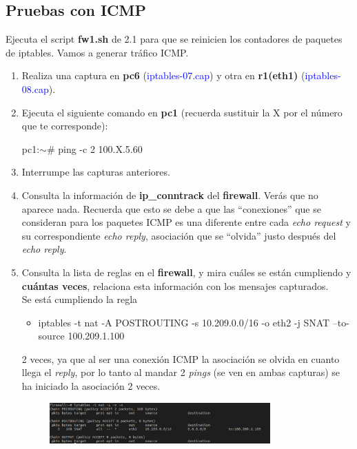 \documentclass[12pt, a4paper]{report}
\begin{document}
\subsection{Pruebas con ICMP}
Ejecuta el script \textbf{fw1.sh} de 2.1 para que se reinicien los contadores de paquetes de iptables. Vamos
a generar tráfico ICMP.
\begin{enumerate}
	\item Realiza una captura en \textbf{pc6} (\textcolor{blue}{iptables-07.cap}) y otra en \textbf{r1(eth1)} (\textcolor{blue}{iptables-08.cap}).
	\item Ejecuta el siguiente comando en \textbf{pc1} (recuerda sustituir la X por el número que te corresponde):
	\begin{center}
		pc1:$\sim$\# ping -c 2 100.X.5.60
	\end{center}
	\item Interrumpe las capturas anteriores.
	\item Consulta la información de \textbf{ip\_conntrack }del \textbf{firewall}. Verás que no aparece nada. Recuerda
	que esto se debe a que las “conexiones” que se consideran para los paquetes ICMP es una diferente
	entre cada \textit{echo request }y su correspondiente \textit{echo reply}, asociación que se “olvida” justo después
	del \textit{echo reply}.
	\item Consulta la lista de reglas en el \textbf{firewall}, y mira cuáles se están cumpliendo y \textbf{cuántas veces},
	relaciona esta información con los mensajes capturados.\\
	
	Se está cumpliendo la regla
	\begin{center}
		\begin{itemize}
			\item iptables -t nat -A POSTROUTING -s 10.209.0.0/16 -o eth2 -j SNAT --to-source 100.209.1.100
		\end{itemize}
	\end{center}
	2 veces, ya que al ser una conexión ICMP la asociación se olvida en cuanto llega el \textit{reply}, por lo tanto al mandar 2 \textit{pings} (se ven en ambas capturas) se ha iniciado la asociación 2 veces.\\
	\begin{figure}[h]
		\centering
		\includegraphics[width=0.8\textwidth]{ej2.1.3_5}
	\end{figure}
\end{enumerate}
\end{document}
